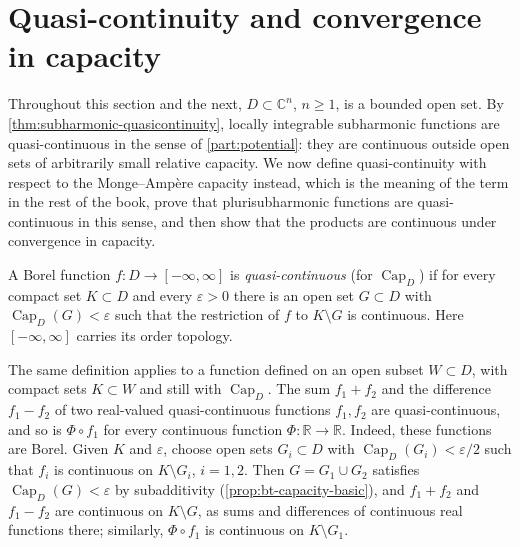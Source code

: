 \section{Quasi-continuity and convergence in capacity}
\label{sec:bt-quasicontinuity}

Throughout this section and the next, $D\subset\mathbb{C}^n$, $n\ge1$, is a bounded open set. By \cref{thm:subharmonic-quasicontinuity}, locally integrable subharmonic functions are quasi-continuous in the sense of \cref{part:potential}: they are continuous outside open sets of arbitrarily small relative capacity. We now define quasi-continuity with respect to the Monge--Amp\`ere capacity instead, which is the meaning of the term in the rest of the book, prove that plurisubharmonic functions are quasi-continuous in this sense, and then show that the products are continuous under convergence in capacity.

\begin{definition}\label{def:quasi-continuity}
A Borel function $f\colon D\to[-\infty,\infty]$ is \emph{quasi-continuous} (for $\operatorname{Cap}_D$) if for every compact set $K\subset D$ and every $\varepsilon>0$ there is an open set $G\subset D$ with $\operatorname{Cap}_D(G)<\varepsilon$ such that the restriction of $f$ to $K\setminus G$ is continuous. Here $[-\infty,\infty]$ carries its order topology.
\end{definition}
The same definition applies to a function defined on an open subset $W\subset D$, with compact sets $K\subset W$ and still with $\operatorname{Cap}_D$. The sum $f_1+f_2$ and the difference $f_1-f_2$ of two real-valued quasi-continuous functions $f_1,f_2$ are quasi-continuous, and so is $\Phi\circ f_1$ for every continuous function $\Phi\colon\mathbb R\to\mathbb R$. Indeed, these functions are Borel. Given $K$ and $\varepsilon$, choose open sets $G_i\subset D$ with $\operatorname{Cap}_D(G_i)<\varepsilon/2$ such that $f_i$ is continuous on $K\setminus G_i$, $i=1,2$. Then $G=G_1\cup G_2$ satisfies $\operatorname{Cap}_D(G)<\varepsilon$ by subadditivity (\cref{prop:bt-capacity-basic}), and $f_1+f_2$ and $f_1-f_2$ are continuous on $K\setminus G$, as sums and differences of continuous real functions there; similarly, $\Phi\circ f_1$ is continuous on $K\setminus G_1$.


